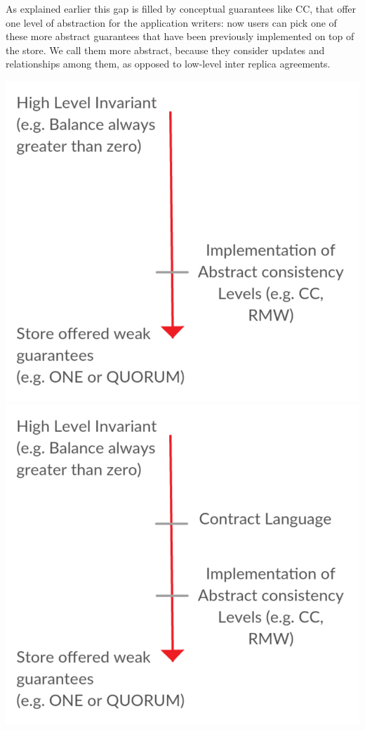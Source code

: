 \documentclass[runningheads]{llncs}
\begin{document}
As explained earlier this gap is filled by conceptual guarantees like CC, that offer one level of abstraction for the application writers: now users can pick one of these more abstract guarantees that have been previously implemented on top of the store. We call them more abstract, because they consider updates and relationships among them, as opposed to low-level inter replica agreements.
\begin{center}
\includegraphics [scale = 0.38]{Gap1.pdf} \hspace{11 mm}
\includegraphics [scale = 0.38]{Gap2.pdf}
\end{center}
\end{document}
